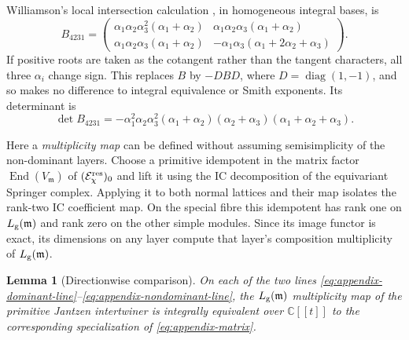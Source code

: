 \documentclass[11pt]{amsart}
\newtheorem{lemma}[theorem]{Lemma}
\theoremstyle{definition}
\theoremstyle{remark}
\begin{document}
Williamson's local intersection calculation
\cite[Section~8.3]{WilliamsonLocal}, in homogeneous integral bases, is
\begin{equation}\label{eq:appendix-matrix}
 B_{4231}=\begin{pmatrix}
 \alpha_1\alpha_2\alpha_3^2(\alpha_1+\alpha_2)&
 \alpha_1\alpha_2\alpha_3(\alpha_1+\alpha_2)\\
 \alpha_1\alpha_2\alpha_3(\alpha_1+\alpha_2)&
 -\alpha_1\alpha_3(\alpha_1+2\alpha_2+\alpha_3)
 \end{pmatrix}.
\end{equation}
If positive roots are taken as the cotangent rather than the tangent
characters, all three $\alpha_i$ change sign.  This replaces $B$ by
$-DBD$, where $D=\operatorname{diag}(1,-1)$, and so makes no difference
to integral equivalence or Smith exponents.  Its determinant is
\begin{equation}\label{eq:appendix-det}
 \det B_{4231}=-\alpha_1^2\alpha_2\alpha_3^2
 (\alpha_1+\alpha_2)(\alpha_2+\alpha_3)
 (\alpha_1+\alpha_2+\alpha_3).
\end{equation}

Here a \emph{multiplicity map} can be defined without assuming
semisimplicity of the non-dominant layers.  Choose a primitive idempotent
in the matrix factor $\operatorname{End}(V_{\mathfrak m})$ of
$(\mathcal E_\chi^{\rm res})_0$ and lift it using the IC decomposition
of the equivariant Springer complex.  Applying it to both normal
lattices and their map isolates the rank-two IC coefficient map.
On the special fibre this idempotent has rank one on
$L_{\rm g}(\mathfrak m)$ and rank zero on the other simple modules.
Since its image functor is exact, its dimensions on any layer compute
that layer's composition multiplicity of $L_{\rm g}(\mathfrak m)$.

\begin{lemma}[Directionwise comparison]\label{lem:appendix-transport}
On each of the two lines
\eqref{eq:appendix-dominant-line}--\eqref{eq:appendix-nondominant-line},
the $L_{\rm g}(\mathfrak m)$ multiplicity map of the primitive
Jantzen intertwiner is integrally equivalent over $\mathbb C[[t]]$
to the corresponding specialization of \eqref{eq:appendix-matrix}.
\end{lemma}
\end{document}
